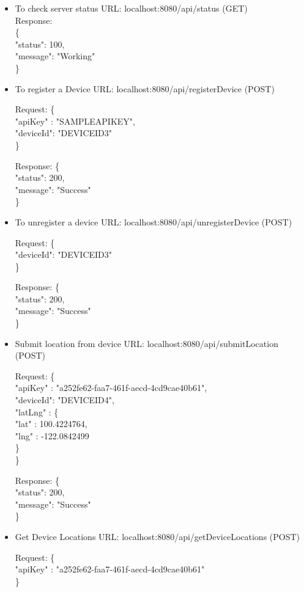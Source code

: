 \documentclass{article}
\begin{document}
\begin{itemize}
\item To check server status
URL: localhost:8080/api/status (GET)
\\Response:\\
\{\\
    "status": 100,\\
    "message": "Working"\\
\}
\item To register a Device
URL: localhost:8080/api/registerDevice (POST)

Request:
\{\\
"apiKey" : "SAMPLEAPIKEY",\\
"deviceId": "DEVICEID3"\\
\}

Response:
\{\\
    "status": 200,\\
    "message": "Success"\\
\}
\item To unregister a device
URL: localhost:8080/api/unregisterDevice (POST)

Request:
\{\\
"deviceId": "DEVICEID3"\\
\}

Response:
\{\\
    "status": 200,\\
    "message": "Success"\\
\}
\item Submit location from device
URL: localhost:8080/api/submitLocation (POST)

Request:
\{\\
"apiKey" : "a252fe62-faa7-461f-aecd-4cd9cae40b61",\\
"deviceId": "DEVICEID4",\\
"latLng" : \{\\
               "lat" : 100.4224764,\\
               "lng" : -122.0842499\\
            \}\\
\}

Response:
\{\\
    "status": 200,\\
    "message": "Success"\\
\}

\item Get Device Locations
URL: localhost:8080/api/getDeviceLocations (POST)

Request:
\{\\
"apiKey" : "a252fe62-faa7-461f-aecd-4cd9cae40b61"\\
\}


\end{itemize}
\end{document}
